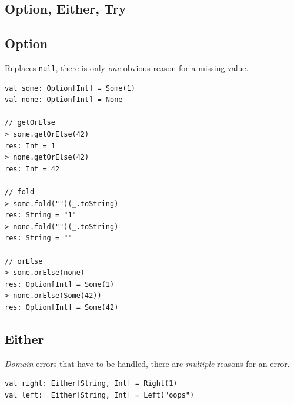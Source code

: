 \documentclass[10pt,landscape,a4paper]{article}
\begin{document}
\begin{multicols*}{4}
  \newpage{}

  \section{Option, Either, Try}

  \subsection{Option}
  \begin{mdframed}
    Replaces \texttt{null}, there is only \textit{one} obvious
    reason for a missing value.
  \end{mdframed}
  \begin{center}
  \end{center}
\begin{verbatim}
val some: Option[Int] = Some(1)
val none: Option[Int] = None

// getOrElse
> some.getOrElse(42)
res: Int = 1
> none.getOrElse(42)
res: Int = 42

// fold
> some.fold("")(_.toString)
res: String = "1"
> none.fold("")(_.toString)
res: String = ""

// orElse
> some.orElse(none)
res: Option[Int] = Some(1)
> none.orElse(Some(42))
res: Option[Int] = Some(42)

\end{verbatim}
  \subsection{Either}
  \begin{mdframed}
    \textit{Domain} errors that have to be handled, there are
    \textit{multiple} reasons for an error.
  \end{mdframed}
  \begin{center}
  \end{center}
\begin{verbatim}
val right: Either[String, Int] = Right(1)
val left:  Either[String, Int] = Left("oops")


\end{verbatim}
\end{multicols*}
\end{document}

